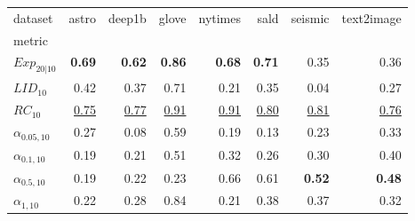 \begin{tabular}{lrrrrrrr}
dataset & astro & deep1b & glove & nytimes & sald & seismic & text2image \\
metric &  &  &  &  &  &  &  \\
$Exp_{20|10}$ & \textbf{0.69} & \textbf{0.62} & \textbf{0.86} & \textbf{0.68} & \textbf{0.71} & 0.35 & 0.36 \\
$LID_{10}$ & 0.42 & 0.37 & 0.71 & 0.21 & 0.35 & 0.04 & 0.27 \\
$RC_{10}$ & \underline{0.75} & \underline{0.77} & \underline{0.91} & \underline{0.91} & \underline{0.80} & \underline{0.81} & \underline{0.76} \\
$\alpha_{0.05, 10}$ & 0.27 & 0.08 & 0.59 & 0.19 & 0.13 & 0.23 & 0.33 \\
$\alpha_{0.1, 10}$ & 0.19 & 0.21 & 0.51 & 0.32 & 0.26 & 0.30 & 0.40 \\
$\alpha_{0.5, 10}$ & 0.19 & 0.22 & 0.23 & 0.66 & 0.61 & \textbf{0.52} & \textbf{0.48} \\
$\alpha_{1, 10}$ & 0.22 & 0.28 & 0.84 & 0.21 & 0.38 & 0.37 & 0.32 \\
\end{tabular}
